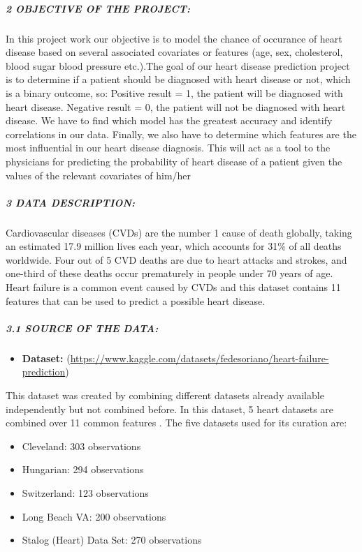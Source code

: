 \documentclass[
]{article}
\providecommand{\tightlist}{%
  \setlength{\itemsep}{0pt}\setlength{\parskip}{0pt}}
\begin{document}
\hypertarget{objective-of-the-project}{%
\subparagraph{2 OBJECTIVE OF THE
PROJECT:}\label{objective-of-the-project}}

In this project work our objective is to model the chance of occurance
of heart disease based on several associated covariates or features
(age, sex, cholesterol, blood sugar blood pressure etc.).The goal of our
heart disease prediction project is to determine if a patient should be
diagnosed with heart disease or not, which is a binary outcome, so:
Positive result = 1, the patient will be diagnosed with heart disease.
Negative result = 0, the patient will not be diagnosed with heart
disease. We have to find which model has the greatest accuracy and
identify correlations in our data. Finally, we also have to determine
which features are the most influential in our heart disease diagnosis.
This will act as a tool to the physicians for predicting the probability
of heart disease of a patient given the values of the relevant
covariates of him/her

\hypertarget{data-description}{%
\subparagraph{3 DATA DESCRIPTION:}\label{data-description}}

Cardiovascular diseases (CVDs) are the number 1 cause of death globally,
taking an estimated 17.9 million lives each year, which accounts for
31\% of all deaths worldwide. Four out of 5 CVD deaths are due to heart
attacks and strokes, and one-third of these deaths occur prematurely in
people under 70 years of age. Heart failure is a common event caused by
CVDs and this dataset contains 11 features that can be used to predict a
possible heart disease.

\hypertarget{source-of-the-data}{%
\subparagraph{3.1 SOURCE OF THE DATA:}\label{source-of-the-data}}

\begin{itemize}
\tightlist
\item
  \textbf{Dataset:}
  (\url{https://www.kaggle.com/datasets/fedesoriano/heart-failure-prediction})
\end{itemize}

This dataset was created by combining different datasets already
available independently but not combined before. In this dataset, 5
heart datasets are combined over 11 common features . The five datasets
used for its curation are:

\begin{itemize}
\item
  Cleveland: 303 observations
\item
  Hungarian: 294 observations
\item
  Switzerland: 123 observations
\item
  Long Beach VA: 200 observations
\item
  Stalog (Heart) Data Set: 270 observations
\end{itemize}
\end{document}
